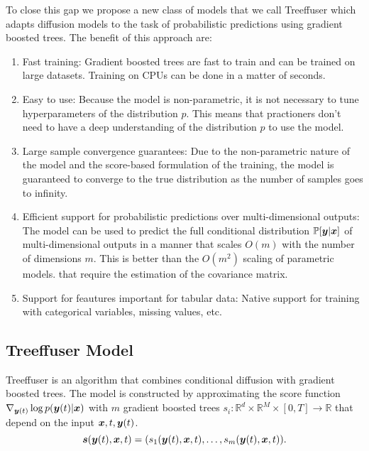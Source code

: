 To close this gap we propose a new class of models that we call Treeffuser which adapts diffusion
models to the task of probabilistic predictions using gradient boosted trees.
The benefit of this approach are:
\begin{enumerate}
    \item Fast training: Gradient boosted trees are fast to train and can be trained on large datasets.
    Training on CPUs can be done in a matter of seconds.
    \item Easy to use: Because the model is non-parametric, it is not necessary to tune hyperparameters
    of the distribution $p$. This means that practioners don't need to have a deep understanding of
    the distribution $p$ to use the model.
    \item Large sample convergence guarantees: Due to the non-parametric nature of the model
    and the score-based formulation of the training, the model is guaranteed to converge to the true
    distribution as the number of samples goes to infinity.
    \item Efficient support for probabilistic predictions over multi-dimensional outputs: The model can be used
    to predict the full conditional distribution $\mathbb{P}[\boldsymbol{y}| \boldsymbol{x}]$ of multi-dimensional outputs in a manner that
    scales $O(m)$ with the number of dimensions $m$. This is better than the $O(m^2)$ scaling of parametric models.
    that require the estimation of the covariance matrix.
    \item Support for feautures important for tabular data: Native support for training with categorical
    variables, missing values, etc.
\end{enumerate}

\subsection{Treeffuser Model}

Treeffuser is an algorithm that combines conditional diffusion with gradient boosted trees.
The model is constructed by approximating the score function  $\nabla_{\boldsymbol{y}(t)} \log p(\boldsymbol{y}(t)|\boldsymbol{x})$
with $m$ gradient boosted trees $s_i: \mathbb{R}^d \times \mathbb{R}^M \times [0, T] \to \mathbb{R}$ that depend on the input $\boldsymbol{x}, t, \boldsymbol{y}(t)$.
\[ \boldsymbol{s}(\boldsymbol{y}(t), \boldsymbol{x}, t) = (s_1(\boldsymbol{y}(t), \boldsymbol{x}, t), \ldots, s_m(\boldsymbol{y}(t), \boldsymbol{x}, t)). \]

